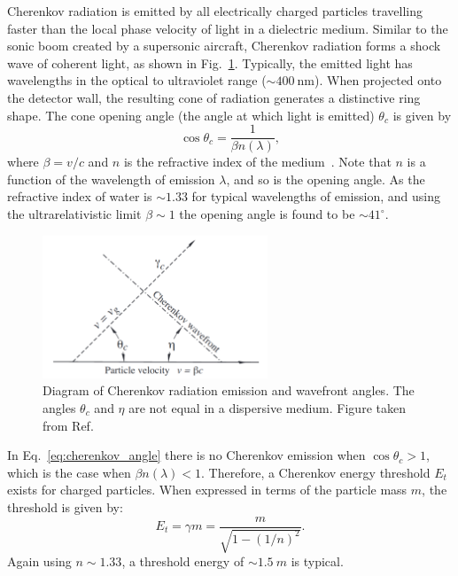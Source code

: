 Cherenkov radiation is emitted by all electrically charged particles travelling faster than the
local phase velocity of light in a dielectric medium. Similar to the sonic boom created by a
supersonic aircraft, Cherenkov radiation forms a shock wave of coherent light, as shown in
Fig.~\ref{fig:cherenkov}. Typically, the emitted light has wavelengths in the optical to
ultraviolet range ($\sim400~\text{nm}$). When projected onto the detector wall, the resulting cone
of radiation generates a distinctive ring shape. The cone opening angle (the angle at which light
is emitted) $\theta_{c}$ is given by
\begin{equation}
    \cos\theta_{c} = \frac{1}{\beta n(\lambda)},
    \label{eq:cherenkov_angle}
\end{equation}
where $\beta=v/c$ and $n$ is the refractive index of the medium~\cite{particle2020}. Note that $n$
is a function of the wavelength of emission $\lambda$, and so is the opening angle. As the
refractive index of water is $\sim 1.33$ for typical wavelengths of emission, and using the
ultrarelativistic limit $\beta\sim 1$ the opening angle is found to be $\sim41^{\circ}$.

\begin{figure} %
    \includegraphics[width=0.6\textwidth]{diagrams/4-chips/cherenkov.pdf}
    \caption[Diagram of Cherenkov radiation emission]
    {Diagram of Cherenkov radiation emission and wavefront angles. The angles $\theta_{c}$ and
        $\eta$ are not equal in a dispersive medium. Figure taken from Ref.~\cite{particle2020}}
    \label{fig:cherenkov}
\end{figure}

In Eq.~\ref{eq:cherenkov_angle} there is no Cherenkov emission when $\cos\theta_{c} > 1$, which is
the case when $\beta n(\lambda)<1$. Therefore, a Cherenkov energy threshold $E_{t}$ exists for
charged particles. When expressed in terms of the particle mass $m$, the threshold is given by:
\begin{equation}
    E_{t} = \gamma m = \frac{m}{\sqrt{1-(1/n)^{2}}}.
    \label{eq:cherenkov_threshold}
\end{equation}
Again using $n\sim 1.33$, a threshold energy of $\sim1.5~m$ is typical.

